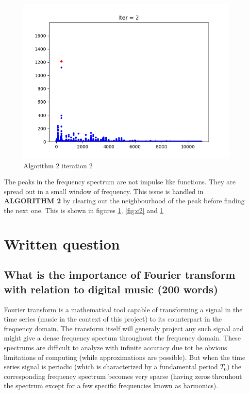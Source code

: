 \documentclass{article}
\begin{document}
\begin{figure}[!htbp]
  \caption{Algorithm 2 iteration 1}\label{fig:c2}
\endminipage\hfill
{}%
  \includegraphics[width=\linewidth]{partial-finding-02.png}
  \caption{Algorithm 2 iteration 2}\label{fig:c3}
\endminipage
\end{figure}

The peaks in the frequency spectrum are not impulse like functions. They are spread out in a small window of frequency. This issue is handled in \textbf{ALGORITHM 2} by clearing out the neighbourhood of the peak before finding the next one. This is shown in figures \ref{fig:c3}, \ref{fig:c2} and \ref{fig:c3}



\section{Written question}
\subsection{What is the importance of Fourier transform with relation to digital music (200 words)}
Fourier transform is a mathematical tool capable of transforming a signal in the time series (music in the context of this project) to its counterpart in the frequency domain. The transform itself will generaly project any such signal and might give a dense frequency spectum throughout the frequency domain. These spectrums are difficult to analyze with infinite accuracy due tot he obvious limitations of computing (while approximations are possible). But when the time series signal is periodic (which is characterized by a fundamental period $T_0$) the corresponding frequency spectrum becomes very sparse (having zeros throuhout the spectrum except for a few specific frequencies known as harmonics).\cite{dict-music}
\end{document}
